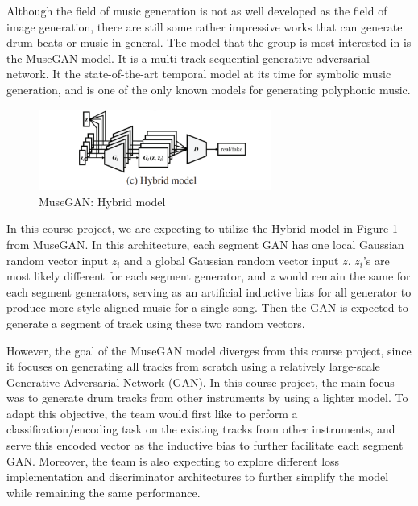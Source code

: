 \begin{par}
    \par \hspace{15pt} Although the field of music generation is not as well developed as the field of image generation, there are still some rather impressive works that can generate drum beats or music in general. The model that the group is most interested in is the MuseGAN \cite{musegan} model. It is a multi-track sequential generative adversarial network. It the state-of-the-art temporal model at its time for symbolic music generation, and is one of the only known models for generating polyphonic music. 

    \begin{figure}[H]
        \centering
        \includegraphics[width=3in]{image/hybrid_model}
        \caption{MuseGAN: Hybrid model}
        \label{fig:hybrid}
    \end{figure}

    \par \hspace{15pt} In this course project, we are expecting to utilize the Hybrid model in Figure \ref{fig:hybrid} from MuseGAN. In this architecture, each segment GAN has one local Gaussian random vector input $z_i$ and a global Gaussian random vector input $z$. $z_i$'s are most likely different for each segment generator, and $z$ would remain the same for each segment generators, serving as an artificial inductive bias for all generator to produce more style-aligned music for a single song. Then the GAN is expected to generate a segment of track using these two random vectors. 

    \par \hspace{15pt} However, the goal of the MuseGAN model diverges from this course project, since it focuses on generating all tracks from scratch using a relatively large-scale Generative Adversarial Network (GAN). In this course project, the main focus was to generate drum tracks from other instruments by using a lighter model. To adapt this objective, the team would first like to perform a classification/encoding task on the existing tracks from other instruments, and serve this encoded vector as the inductive bias to further facilitate each segment GAN. Moreover, the team is also expecting to explore different loss implementation and discriminator architectures to further simplify the model while remaining the same performance. 


\end{par}
